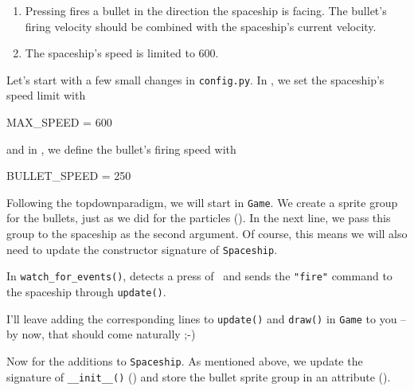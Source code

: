 
\begin{enumerate}
	\item Pressing  fires a bullet in the direction the spaceship is facing. The bullet's firing velocity should be combined with the spaceship's current velocity.
	\item The spaceship's speed is limited to \SI{600}{\pxsec}.
\end{enumerate}
\er

Let's start with a few small changes in \texttt{config.py}. In , we set the spaceship's speed limit with
\begin{codebox}
	MAX_SPEED = 600
\end{codebox}

and in , we define the bullet's firing speed with
\begin{codebox}
	BULLET_SPEED = 250
\end{codebox}

Following the \gls{topdownparadigm}, we will start in \texttt{Game}. We create a sprite group for the bullets, just as we did for the particles (). In the next line, we pass this group to the spaceship as the second argument. Of course, this means we will also need to update the constructor signature of \texttt{Spaceship}.


In \texttt{watch\_for\_events()},  detects a press of~ and sends the \verb#"fire"# command to the spaceship through \texttt{update()}.


I'll leave adding the corresponding lines to \texttt{update()} and \texttt{draw()} in \texttt{Game} to you -- by now, that should come naturally ;-)

Now for the additions to \texttt{Spaceship}. As mentioned above, we update the signature of \texttt{\_\_init\_\_()} () and store the bullet sprite group in an attribute ().

